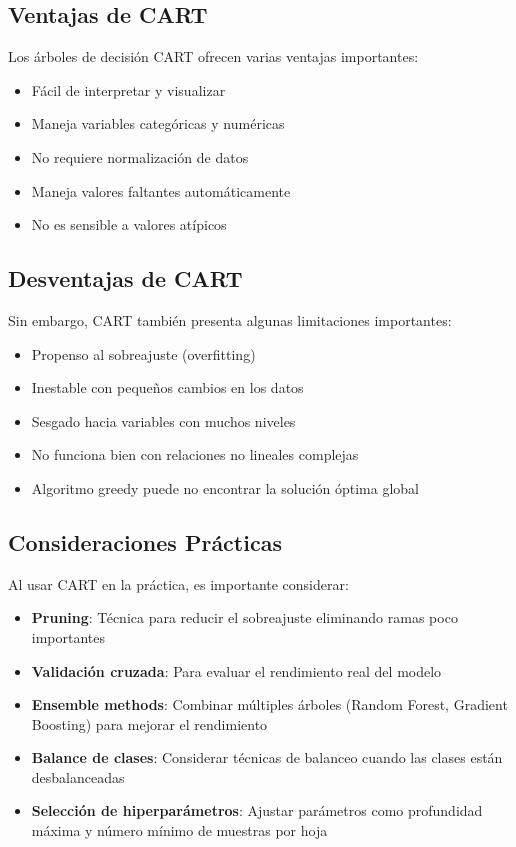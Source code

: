 \documentclass[12pt]{article}
\begin{document}
\subsection{Ventajas de CART}

Los árboles de decisión CART ofrecen varias ventajas importantes:

\begin{itemize}
    \item Fácil de interpretar y visualizar
    \item Maneja variables categóricas y numéricas
    \item No requiere normalización de datos
    \item Maneja valores faltantes automáticamente
    \item No es sensible a valores atípicos
\end{itemize}

\subsection{Desventajas de CART}

Sin embargo, CART también presenta algunas limitaciones importantes:

\begin{itemize}
    \item Propenso al sobreajuste (overfitting)
      \item Inestable con pequeños cambios en los datos
      \item Sesgado hacia variables con muchos niveles
      \item No funciona bien con relaciones no lineales complejas
      \item Algoritmo greedy puede no encontrar la solución óptima global
\end{itemize}

\subsection{Consideraciones Prácticas}

Al usar CART en la práctica, es importante considerar:

\begin{itemize}
    \item \textbf{Pruning}: Técnica para reducir el sobreajuste eliminando ramas poco importantes
    \item \textbf{Validación cruzada}: Para evaluar el rendimiento real del modelo
    \item \textbf{Ensemble methods}: Combinar múltiples árboles (Random Forest, Gradient Boosting) para mejorar el rendimiento
    \item \textbf{Balance de clases}: Considerar técnicas de balanceo cuando las clases están desbalanceadas
    \item \textbf{Selección de hiperparámetros}: Ajustar parámetros como profundidad máxima y número mínimo de muestras por hoja
\end{itemize}
\end{document}
